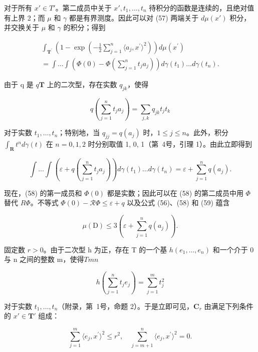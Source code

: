 对于所有 \(x' \in T'\)。第二成员中关于 \(x', t_{1}, \ldots, t_{n}\) 待积分的函数是连续的，且绝对值有上界 2；而 \(\mu\) 和 \(\gamma\) 都是有界测度。因此可以对 (57) 两端关于 \(d\mu(x')\) 积分，并交换关于 \(\mu\) 和 \(\gamma\) 的积分；得到

\[
\begin{array}{l} \int_ {\mathbf {T} ^ {\prime}} \left(1 - \exp \left(- \frac {1}{2} \sum_ {j = 1} ^ {n} \langle a _ {j}, x ^ {\prime} \rangle^ {2}\right)\right) d \mu (x ^ {\prime}) \\ = \int \dots \int \left(\Phi (0) - \Phi \left(\sum_ {j = 1} ^ {n} t _ {j} a _ {j}\right)\right) d \gamma (t _ {1}) \dots d \gamma (t _ {n}). \end{array}\tag{58}
\]

由于 q 是 \(q\)\(\mathbf{T}\) 上的二次型，存在实数 \(q_{jk}\)，使得

\[
q \left(\sum_ {j = 1} ^ {n} t _ {j} a _ {j}\right) = \sum_ {j, k} q _ {j k} t _ {j} t _ {k}
\]

对于实数 \(t_1, \ldots, t_n\)；特别地，当 \(q_{jj} = q(a_j)\) 时，\(1 \leqslant j \leqslant n\)。此外，积分 \(\int_{\mathbf{R}} t^n d\gamma(t)\) 在 \(n = 0, 1, 2\) 时分别取值 1, 0, 1（第~4号，引理 1）。由此立即得到

\[
\int \dots \int \left(\varepsilon + q \left(\sum_ {j = 1} ^ {n} t _ {j} a _ {j}\right)\right) d \gamma (t _ {1}) \dots d \gamma (t _ {n}) = \varepsilon + \sum_ {j = 1} ^ {n} q (a _ {j}).\tag{59}
\]

现在，(58) 的第一成员和 \(\Phi(0)\) 都是实数；因此可以在 (58) 的第二成员中用 \(\Phi\) 替代 \(R\Phi\)。不等式 \(\Phi(0)-\mathcal{R}\Phi\leqslant\varepsilon+q\) 以及公式 (56)、(58) 和 (59) 蕴含

\[
\mu (\mathrm{D}) \leqslant 3 \left(\varepsilon + \sum_ {j = 1} ^ {n} q (a _ {j})\right).\tag{60}
\]

固定数 \(r > 0\)。由于二次型 h 为正，存在 T 的一个基 \(h\)\((e_1, \ldots, e_n)\) 和一个介于 0 与 n 之间的整数 m，使得\(T\)\(m\)\(n\)

\[
h \left(\sum_ {j = 1} ^ {n} t _ {j} e _ {j}\right) = \sum_ {j = 1} ^ {m} t _ {j} ^ {2}
\]

对于实数 \(t_1, \ldots, t_n\)（附录，第~1号，命题 2）。于是立即可见，\(\mathbf{C}_r\) 由满足下列条件的 \(x' \in \mathbf{T}'\) 组成：

\[
\sum_ {j = 1} ^ {m} \langle e _ {j}, x ^ {\prime} \rangle^ {2} \leqslant r ^ {2}, \quad \sum_ {j = m + 1} ^ {n} \langle e _ {j}, x ^ {\prime} \rangle^ {2} = 0.
\]

